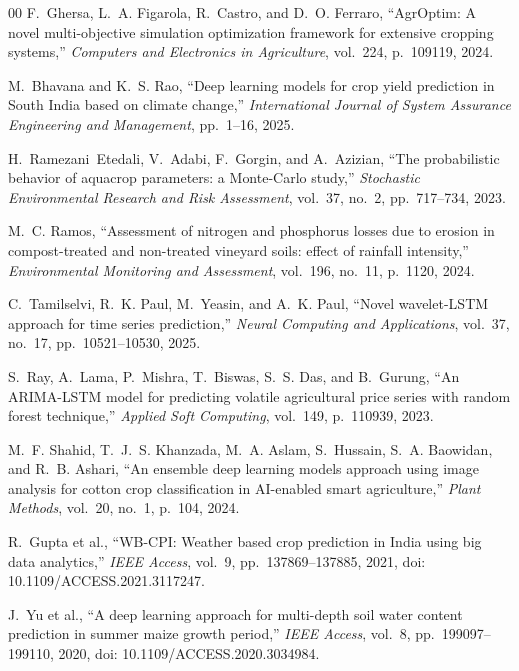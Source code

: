 \documentclass[conference]{IEEEtran}
\begin{document}
\begin{thebibliography}{00}
F.~Ghersa, L.~A. Figarola, R.~Castro, and D.~O. Ferraro,
``{AgrOptim}: A novel multi-objective simulation optimization framework for extensive cropping systems,''
\textit{Computers and Electronics in Agriculture}, vol.~224, p.~109119, 2024.

M.~Bhavana and K.~S. Rao,
``Deep learning models for crop yield prediction in {S}outh {I}ndia based on climate change,''
\textit{International Journal of System Assurance Engineering and Management}, pp.~1--16, 2025.

H.~Ramezani~Etedali, V.~Adabi, F.~Gorgin, and A.~Azizian,
``The probabilistic behavior of aquacrop parameters: a {M}onte-{C}arlo study,''
\textit{Stochastic Environmental Research and Risk Assessment}, vol.~37, no.~2, pp.~717--734, 2023.

M.~C. Ramos,
``Assessment of nitrogen and phosphorus losses due to erosion in compost-treated and non-treated vineyard soils: effect of rainfall intensity,''
\textit{Environmental Monitoring and Assessment}, vol.~196, no.~11, p.~1120, 2024.

C.~Tamilselvi, R.~K. Paul, M.~Yeasin, and A.~K. Paul,
``Novel wavelet-{LSTM} approach for time series prediction,''
\textit{Neural Computing and Applications}, vol.~37, no.~17, pp.~10521--10530, 2025.

S.~Ray, A.~Lama, P.~Mishra, T.~Biswas, S.~S. Das, and B.~Gurung,
``An {ARIMA}-{LSTM} model for predicting volatile agricultural price series with random forest technique,''
\textit{Applied Soft Computing}, vol.~149, p.~110939, 2023.

M.~F. Shahid, T.~J.~S. Khanzada, M.~A. Aslam, S.~Hussain, S.~A. Baowidan, and R.~B. Ashari,
``An ensemble deep learning models approach using image analysis for cotton crop classification in {AI}-enabled smart agriculture,''
\textit{Plant Methods}, vol.~20, no.~1, p.~104, 2024.

R.~Gupta et al.,
``{WB-CPI}: Weather based crop prediction in {I}ndia using big data analytics,''
\textit{IEEE Access}, vol.~9, pp.~137869--137885, 2021, 
doi: 10.1109/ACCESS.2021.3117247.

J.~Yu et al.,
``A deep learning approach for multi-depth soil water content prediction in summer maize growth period,''
\textit{IEEE Access}, vol.~8, pp.~199097--199110, 2020,
doi: 10.1109/ACCESS.2020.3034984.


\end{thebibliography}
\end{document}
